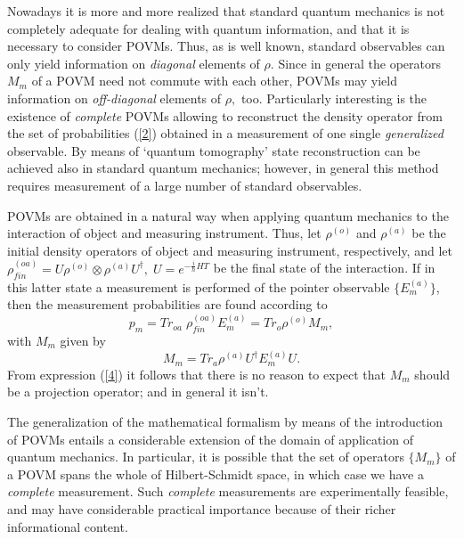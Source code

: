 \documentclass[12pt]{article}
\begin{document}
Nowadays it is more and more realized that standard quantum
mechanics is not completely adequate for dealing with quantum
information, and that it is necessary to consider POVMs. Thus, as
is well known, standard observables can only yield information on
\textit{diagonal} elements of $\rho.$ Since in general the
operators $M_m$ of a POVM need not commute with each other, POVMs
may yield information on \textit{off-diagonal} elements of $\rho,$
too. Particularly interesting is the existence of
\textit{complete} POVMs allowing to reconstruct the density
operator from the set of probabilities (\ref{2}) obtained in a
measurement of one single \textit{generalized} observable. By
means of `quantum tomography' state reconstruction can be achieved
also in standard quantum mechanics; however, in general this
method requires measurement of a large number of standard
observables.

POVMs are obtained in a natural way when applying quantum
mechanics to the interaction of object and measuring instrument.
Thus, let $\rho^{(o)}$ and $\rho^{(a)}$ be the initial density
operators of object and measuring instrument, respectively, and
let $\rho^{(oa)}_{fin} = U\rho^{(o)}\otimes \rho^{(a)}
U^\dagger,\;U = e^{-\frac{i}{\hbar}HT}$ be the final state of the
interaction. If in this latter state a measurement is performed of
the pointer observable $\{E^{(a)}_m\}$, then the measurement
probabilities are found according to
\begin{equation}\label{3} p_{m} = Tr_{oa}\;
\rho^{(oa)}_{fin} E^{(a)}_m= Tr_o \rho^{(o)} M_m,\end{equation}
with $M_m$ given by
\begin{equation}\label{4} M_m =Tr_{a} \rho^{(a)} U^\dagger
E^{(a)}_m U.\end{equation}
 From expression (\ref{4}) it follows that there is no reason to expect that
$M_{m}$
 should be a projection operator; and in general it isn't.

The generalization of the mathematical formalism by means of the
introduction of POVMs entails a considerable extension of the
domain of application of quantum mechanics. In particular, it is
possible that the set of operators $\{M_m\}$ of a POVM spans the
whole of Hilbert-Schmidt space, in which case we have a
\textit{complete} measurement. Such \textit{complete} measurements
are experimentally feasible\cite{dM98,dM2002,AlBaNi04}, and may
have considerable practical importance because of their richer
informational content.
\end{document}
